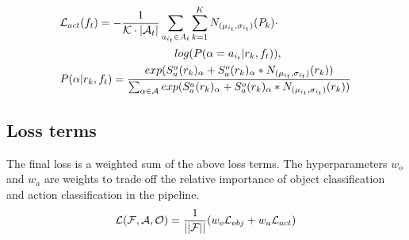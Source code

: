 \begin{align}
\label{eqn:act_cls_loss}
&{\mathcal L}_{act} (f_t) = -\frac{1}{{\mathcal K}\cdot |{\mathcal A}_t|}\sum_{a_{i_t}\in {A_t}}\sum_{k=1}^{K} N_{(\mu_{i_t}, \sigma_{i_t})}(P_k) \cdot \nonumber \\
&~~~~~~~~~~~~~~~~~~~~~~~~~~~~~~~log(P(\alpha=a_{i_t}|r_k, f_t)), \nonumber\\
&P(\alpha|r_k, f_t) = \frac{exp(S_a^a(r_k)_{\alpha}+S_a^o(r_k)_{\alpha}*N_{(\mu_{i_t},\sigma_{i_t})}(r_k))}{\sum_{\alpha \in {\mathcal A}}exp(S_a^a(r_k)_{\alpha}+S_a^o(r_k)_{\alpha}*N_{(\mu_{i_t},\sigma_{i_t})}(r_k))}
\end{align}

\subsection{Loss terms}
The final loss is a weighted sum of the above loss terms. The hyperparameters $w_o$ and $w_a$ are weights to trade off the relative importance of object classification and action classification in the pipeline.
\begin{align}
\label{eqn:final_loss_term}
{\mathcal L}({\mathcal F}, {\mathcal A}, {\mathcal O}) = \frac{1}{||{\mathcal F}||}(w_o{\mathcal L}_{obj}+w_a{\mathcal L}_{act})
\end{align}

